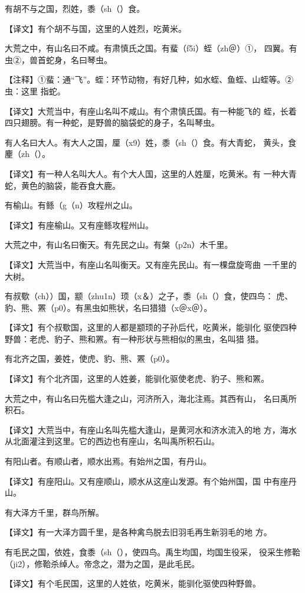 \documentclass[a4paper,12pt,UTF8,twoside]{ctexbook}
\begin{document}
有胡不与之国，烈姓，黍（sh（）食。

【译文】有个胡不与国，这里的人姓烈，吃黄米。

大荒之中，有山名曰不咸。有肃慎氏之国。有蜚（f5i）蛭（zh＠）①， 四翼。有虫②，兽首蛇身，名曰琴虫。

【注释】①蜚：通“飞”。蛭：环节动物，有好几种，如水蛭、鱼蛭、山蛭等。②虫：这里 指蛇。

【译文】大荒当中，有座山名叫不咸山。有个肃慎氏国。有一种能飞的 蛭，长着四只翅膀。有一种蛇，是野兽的脑袋蛇的身子，名叫琴虫。

有人名曰大人。有大人之国，厘（x9）姓，黍（sh（）食。有大青蛇， 黄头，食麈（zh（）。

【译文】有一种人名叫大人。有个大人国，这里的人姓厘，吃黄米。有 一种大青蛇，黄色的脑袋，能吞食大鹿。

有榆山。有鲧（g（n）攻程州之山。

【译文】有座榆山。又有座鲧攻程州山。

大荒之中，有山名曰衡天。有先民之山。有槃（p2n）木千里。

【译文】大荒当中，有座山名叫衡天。又有座先民山。有一棵盘旋弯曲 一千里的大树。

有叔歜（ch））国，颛（zhu1n）顼（x＆）之子，黍（sh（）食，使四鸟： 虎、豹、熊、罴（p0）。有黑虫如熊状，名曰猎猎（x＠x＠）。

【译文】有个叔歜国，这里的人都是颛顼的子孙后代，吃黄米，能驯化 驱使四种野兽：老虎、豹子、熊和罴。有一种形状与熊相似的黑虫，名叫猎 猎。

有北齐之国，姜姓，使虎、豹、熊、罴（p0）。

【译文】有个北齐国，这里的人姓姜，能驯化驱使老虎、豹子、熊和罴。

大荒之中，有山名曰先槛大逢之山，河济所入，海北注焉。其西有山， 名曰禹所积石。

【译文】大荒当中，有座山名叫先槛大逢山，是黄河水和济水流入的地 方，海水从北面灌注到这里。它的西边也有座山，名叫禹所积石山。

有阳山者。有顺山者，顺水出焉。有始州之国，有丹山。

【译文】有座阳山。又有座顺山，顺水从这座山发源。有个始州国，国 中有座丹山。

有大泽方千里，群鸟所解。

【译文】有一大泽方圆千里，是各种禽鸟脱去旧羽毛再生新羽毛的地 方。

有毛民之国，依姓，食黍（sh（），使四鸟。禹生均国，均国生役采， 役采生修鞈（ji2），修鞈杀绰人。帝念之，潜为之国，是此毛民。

【译文】有个毛民国，这里的人姓依，吃黄米，能驯化驱使四种野兽。
\end{document}
